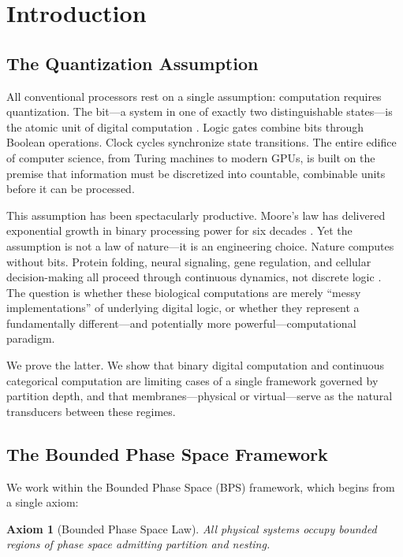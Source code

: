 \documentclass[twocolumn,10pt]{article}
\newtheorem{axiom}{Axiom}
\theoremstyle{remark}
\begin{document}
\section{Introduction}
\label{sec:introduction}

\subsection{The Quantization Assumption}

All conventional processors rest on a single assumption: computation requires quantization. The bit---a system in one of exactly two distinguishable states---is the atomic unit of digital computation \cite{shannon1948}. Logic gates combine bits through Boolean operations. Clock cycles synchronize state transitions. The entire edifice of computer science, from Turing machines \cite{turing1936} to modern GPUs, is built on the premise that information must be discretized into countable, combinable units before it can be processed.

This assumption has been spectacularly productive. Moore's law has delivered exponential growth in binary processing power for six decades \cite{moore1965}. Yet the assumption is not a law of nature---it is an engineering choice. Nature computes without bits. Protein folding, neural signaling, gene regulation, and cellular decision-making all proceed through continuous dynamics, not discrete logic \cite{bray1995,hartwell1999}. The question is whether these biological computations are merely ``messy implementations'' of underlying digital logic, or whether they represent a fundamentally different---and potentially more powerful---computational paradigm.

We prove the latter. We show that binary digital computation and continuous categorical computation are limiting cases of a single framework governed by partition depth, and that membranes---physical or virtual---serve as the natural transducers between these regimes.

\subsection{The Bounded Phase Space Framework}

We work within the Bounded Phase Space (BPS) framework, which begins from a single axiom:

\begin{axiom}[Bounded Phase Space Law]
\label{axiom:bps}
All physical systems occupy bounded regions of phase space admitting partition and nesting.
\end{axiom}
\end{document}
